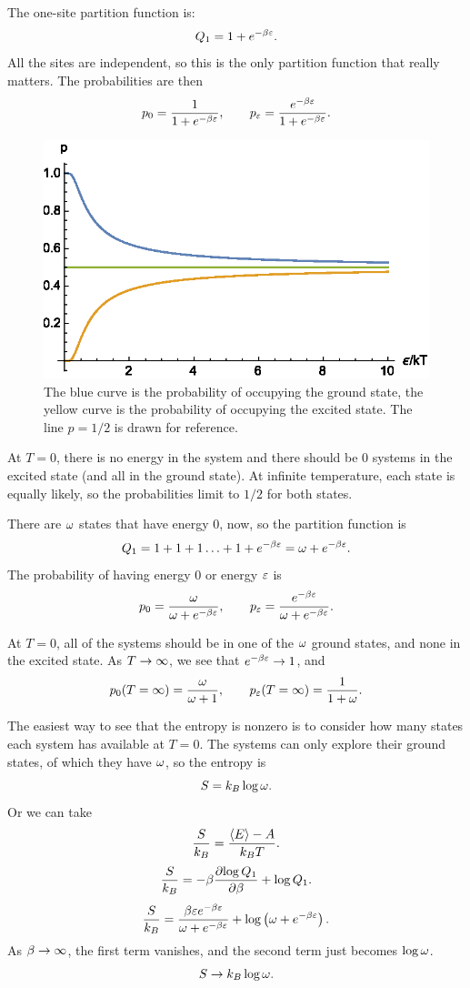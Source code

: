 \documentclass[12pt]{article}
\begin{document}
 The one-site partition function is:
\[ Q_1 = 1+ e^{-\beta \varepsilon}.\]
All the sites are independent, so this is the only partition function that really matters. The probabilities are then
\[ p_0 = \frac{1}{1+e^{-\beta \varepsilon}},\qquad p_\varepsilon = \frac{e^{-\beta \varepsilon}}{1+e^{-\beta \varepsilon}}.\]
\begin{figure}[h]
\centering
\includegraphics[scale=1.0]{probabilities_midterm.eps}
\caption{The blue curve is the probability of occupying the ground state, the yellow curve is the probability of occupying the excited state. The line $p=1/2$ is drawn for reference.}
\end{figure}

 At $T=0$, there is no energy in the system and there should be 0 systems in the excited state (and all in the ground state). At infinite temperature, each state is equally likely, so the probabilities limit to $1/2$ for both states.

 There are $\omega$ states that have energy 0, now, so the partition function is
\[ Q_1 = 1 + 1 + 1 \ldots + 1 + e^{-\beta\varepsilon} = \omega + e^{-\beta \varepsilon}.\]
The probability of having energy 0 or energy $\varepsilon$ is
\[ p_0 = \frac{\omega}{\omega+e^{-\beta\varepsilon}}, \qquad p_\varepsilon = \frac{e^{-\beta\varepsilon}}{\omega + e^{-\beta \varepsilon}}.\]

 At $T=0$, all of the systems should be in one of the $\omega$ ground states, and none in the excited state. As $T\rightarrow \infty$, we see that $e^{-\beta\varepsilon}\rightarrow 1$, and
\[ p_0(T=\infty) = \frac{\omega}{\omega+1},\qquad p_\varepsilon(T=\infty) = \frac{1}{1+\omega}.\]

 The easiest way to see that the entropy is nonzero is to consider how many states each system has available at $T=0$. The systems can only explore their ground states, of which they have $\omega$, so the entropy is
\[ S = k_B\log \omega.\]
Or we can take
\[ \frac{S}{k_B} = \frac{\left \langle E \right \rangle - A}{k_BT}.\]
\[ \frac{S}{k_B} = -\beta\frac{\partial {\log Q_1}}{\partial {\beta}} + \log Q_1.\]
\[ \frac{S}{k_B} = \frac{\beta\varepsilon e^{-\beta\varepsilon}}{\omega+e^{-\beta\varepsilon}} + \log\left(\omega+e^{-\beta\varepsilon}\right).\]
As $\beta\rightarrow \infty$, the first term vanishes, and the second term just becomes $\log\omega$.
\[ S \rightarrow k_B \log\omega.\]
\end{document}
